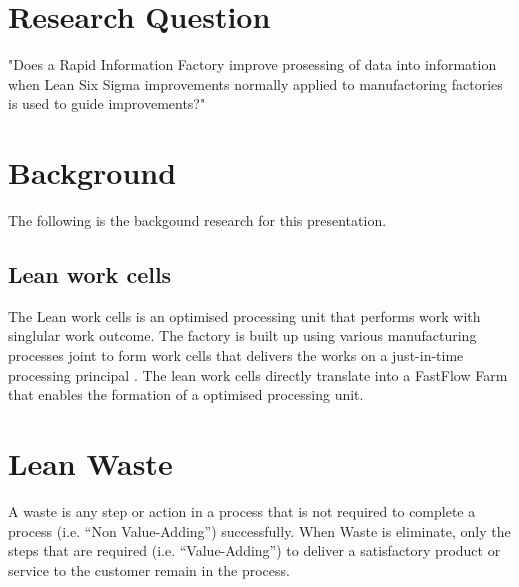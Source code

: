 \documentclass{sigplanconf}
\begin{document}
\section{Research Question}
"Does a Rapid Information Factory improve prosessing of data into information when Lean Six Sigma improvements normally applied to manufactoring factories is used to guide improvements?"
\section{Background}
The following is the backgound research for this presentation.
\subsection{Lean work cells}
The Lean work cells \cite{black2003lean} is an optimised processing unit that performs work with singlular work outcome. The factory is built up using various manufacturing processes joint to form work cells that delivers the works on a just-in-time processing principal \cite{cheng1996just}.
The lean work cells directly translate into a FastFlow Farm \cite{aldinucci2009fastflow} that enables the formation of a optimised processing unit.
\section{Lean Waste}
A waste is any step or action in a process that is not required to complete a process (i.e. “Non Value-Adding”) successfully. When Waste is eliminate, only the steps that are required (i.e. “Value-Adding”) to deliver a satisfactory product or service to the customer remain in the process.
\end{document}
